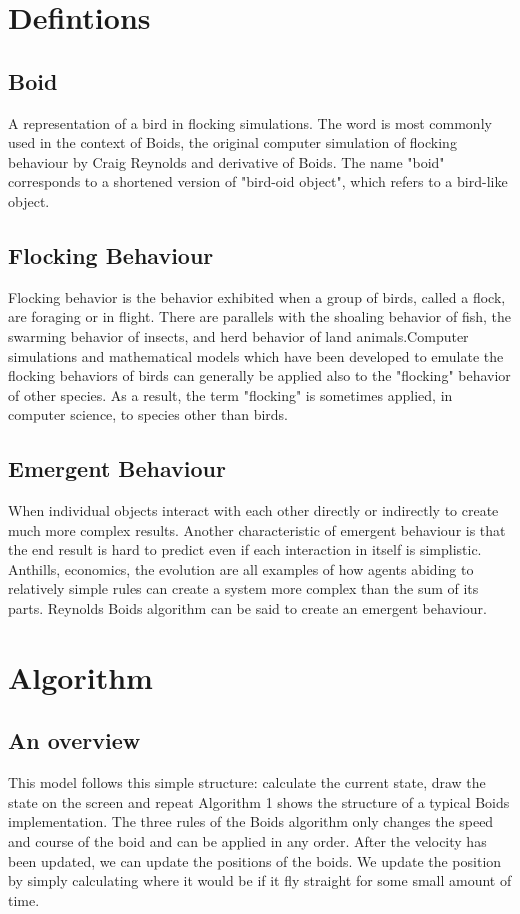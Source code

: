 \documentclass{article}
\begin{document}
\section{Defintions}

\subsection{Boid}
A representation of a bird in flocking simulations. The word is most commonly used in the context of Boids, the original computer simulation of flocking behaviour by Craig Reynolds and derivative of Boids. The name "boid" corresponds to a shortened version of "bird-oid object", which refers to a bird-like object.

\subsection{Flocking Behaviour}
Flocking behavior is the behavior exhibited when a group of birds, called a flock, are foraging or in flight. There are parallels with the shoaling behavior of fish, the swarming behavior of insects, and herd behavior of land animals.Computer simulations and mathematical models which have been developed to emulate the flocking behaviors of birds can generally be applied also to the "flocking" behavior of other species. As a result, the term "flocking" is sometimes applied, in computer science, to species other than birds.

\subsection{Emergent Behaviour}
When individual objects interact with each other directly or indirectly to create much more complex results. Another characteristic of emergent behaviour is that the end result is hard to predict even if each interaction in itself is simplistic. Anthills, economics, the evolution are all examples of how agents abiding to relatively simple rules can create a system more complex than the sum of its parts. Reynolds Boids algorithm can be said to create an emergent behaviour.

\section{Algorithm}

\subsection{An overview}
This model follows this simple structure: calculate the current state, draw the state on the screen and repeat Algorithm 1 shows the structure of a typical Boids implementation. The three rules of the Boids algorithm only changes the speed and course of the boid and can be applied in any order. After the velocity has been updated, we can update the positions of the boids. We update the position by simply calculating where it would be if it fly straight for some small amount of time.
\end{document}
